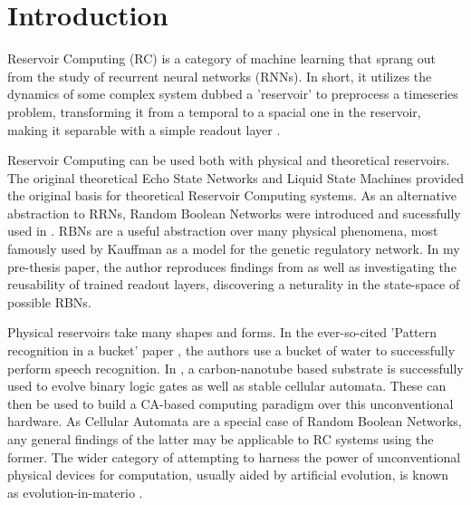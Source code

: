 \chapter{Introduction}

Reservoir Computing (RC) is a category of machine learning that sprang out from the study of recurrent neural networks (RNNs).
In short, it utilizes the dynamics of some complex system dubbed a 'reservoir' to preprocess a timeseries problem,
transforming it from a temporal to a spacial one in the reservoir,
making it separable with a simple readout layer \cite{lukovsevivcius2012reservoir}.

Reservoir Computing can be used both with physical and theoretical reservoirs.
The original theoretical Echo State Networks \cite{jaeger2002adaptive} and Liquid State Machines \cite{natschlager2002liquid} provided the original basis for theoretical Reservoir Computing systems.
As an alternative abstraction to RRNs,
Random Boolean Networks \cite{gershenson2004introduction} were introduced and sucessfully used in \cite{rbn-reservoir}.
RBNs are a useful abstraction over many physical phenomena, most famously used by Kauffman \cite{kauffman1969metabolic} as a model for the genetic regulatory network.
In my pre-thesis paper, the author reproduces findings from \cite{rbn-reservoir} as well as investigating the reusability of trained readout layers,
discovering a neturality in the state-space of possible RBNs.

Physical reservoirs take many shapes and forms.
In the ever-so-cited 'Pattern recognition in a bucket' paper \cite{fernando2003pattern},
the authors use a bucket of water to successfully perform speech recognition.
In \cite{farstad2015evolving},
a carbon-nanotube based substrate is successfully used to evolve binary logic gates as well as stable cellular automata.
These can then be used to build a CA-based computing paradigm over this unconventional hardware.
As Cellular Automata are a special case of Random Boolean Networks,
any general findings of the latter may be applicable to RC systems using the former.
The wider category of attempting to harness the power of unconventional physical devices for computation,
usually aided by artificial evolution,
is known as evolution-in-materio \cite{miller2002evolution}.

